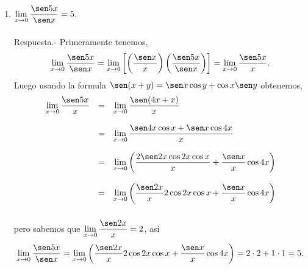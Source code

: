 \begin{enumerate}[\bfseries 1.]
    \item $\lim\limits_{x\to 0}\dfrac{\sen 5x}{\sen x}=5.$\\\\
	Respuesta.-\; Primeramente tenemos,
	$$\lim_{x\to 0}\dfrac{\sen 5x}{\sen x}=\lim_{x\to 0}\left[\left(\dfrac{\sen x}{x}\right)\left(\dfrac{\sen 5x}{\sen x}\right)\right]=\lim_{x\to 0}\dfrac{\sen 5x}{x}.$$
	Luego usando la formula $\sen(x+y)=\sen x \cos y + \cos x \sen y$ obtenemos,
	$$\begin{array}{rcl}
	    \lim\limits_{x\to 0}\dfrac{\sen 5x}{x}&=&\lim\limits_{x\to 0}\dfrac{\sen(4x+x)}{x}\\\\
						  &=&\lim\limits_{x\to 0}\dfrac{\sen 4x \cos x + \sen x \cos 4x}{x}\\\\
						  &=&\lim\limits_{x\to 0}\left(\dfrac{2\sen 2x \cos 2x \cos x}{x}+\dfrac{\sen x}{x}\cos 4x\right)\\\\
						  &=&\lim\limits_{x\to 0}\left(\dfrac{\sen 2x}{x}2\cos 2x \cos x + \dfrac{\sen x}{x}\cos 4x\right)\\\\
	\end{array}$$
	pero sabemos que $\lim\limits_{x\to 0}\dfrac{\sen 2x}{x}=2$, así 
	$$\lim_{x\to 0}\dfrac{\sen 5x}{\sen x}=\lim\limits_{x\to 0}\left(\dfrac{\sen 2x}{x}2\cos 2x \cos x + \dfrac{\sen x}{x}\cos 4x\right)=2\cdot 2 + 1\cdot 1 = 5.$$\\\\


\end{enumerate}

